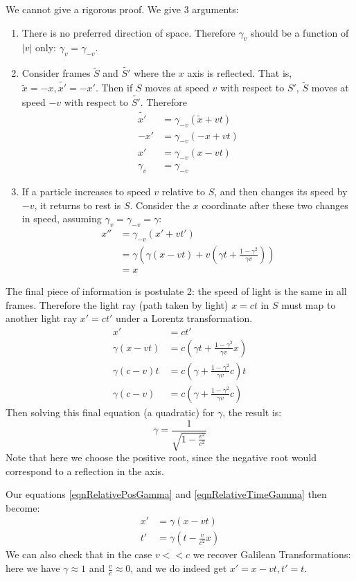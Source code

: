 \documentclass[../Main.tex]{subfiles}
\begin{document}
We cannot give a rigorous proof. We give 3 arguments:
\begin{enumerate}
    \item There is no preferred direction of space. Therefore $\gamma_v$ should be a function of $|v|$ only: $\gamma_v = \gamma_{-v}$.
    \item Consider frames $\tilde{S}$ and $\tilde{S'}$ where the $x$ axis is reflected. That is, $\tilde{x} = -x, \tilde{x'} = -x'$. Then if $S$ moves at speed $v$ with respect to $S'$, $\tilde{S}$ moves at speed $-v$ with respect to $\tilde{S'}$. Therefore
    \begin{align*}
        \tilde{x'} &= \gamma_{-v}(\tilde{x} + vt) \\
        -x' &= \gamma_{-v} (-x + vt) \\
        x' &= \gamma_{-v} (x - vt) \\
        \gamma_v &= \gamma_{-v}
    \end{align*}
    \item If a particle increases to speed $v$ relative to $S$, and then changes its speed by $-v$, it returns to rest is $S$. Consider the $x$ coordinate after these two changes in speed, assuming $\gamma_v = \gamma_{-v} = \gamma$:
        \begin{align*}
            x'' &= \gamma_{-v} (x' + vt') \\
            &= \gamma \left(\gamma (x - vt) + v\left(\gamma t + \frac{1 - \gamma^2}{\gamma v}\right)\right) \\
            &= x
        \end{align*}
\end{enumerate}
The final piece of information is postulate 2: the speed of light is the same in all frames. Therefore the light ray (path taken by light) $x = ct$ in $S$ must map to another light ray $x' = ct'$ under a Lorentz transformation.
\begin{align*}
    x' &= ct' \\
    \gamma (x - vt) &= c(\gamma t + \frac{1 - \gamma^2}{\gamma v}x) \\
    \gamma (c - v)t &= c(\gamma + \frac{1 - \gamma^2}{\gamma v}c)t \\
    \gamma (c - v) &= c(\gamma + \frac{1 - \gamma^2}{\gamma v}c)
\end{align*}
Then solving this final equation (a quadratic) for $\gamma$, the result is:
\begin{equation}
    \gamma = \frac{1}{\sqrt{1 - \frac{v^2}{c^2}}}
    \label{eqnLorentzFactor}
\end{equation}
Note that here we choose the positive root, since the negative root would correspond to a reflection in the axis.\par
Our equations \ref{eqnRelativePosGamma} and \ref{eqnRelativeTimeGamma} then become:
\begin{align}
    x' &= \gamma (x - vt) \label{eqnRelativePos} \\
    t' &= \gamma \left(t - \frac{v}{c^2}x\right) \label{eqnRelativeTime}
\end{align}
We can also check that in the case $v << c$ we recover Galilean Transformations: here we have $\gamma \approx 1$ and $\frac{v}{c} \approx 0$, and we do indeed get $x' = x - vt, t' = t$.
\end{document}
